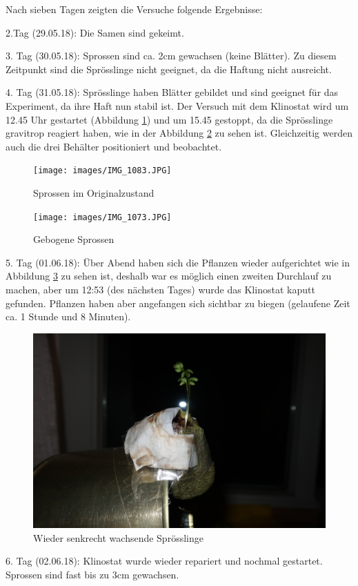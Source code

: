 \documentclass[
11pt, 
ngerman,
listof=totocnumbered,
oneside,
bibliography=totocnumbered,
abstracton
]{scrreprt}
\begin{document}
Nach sieben Tagen zeigten die Versuche folgende Ergebnisse:

2.Tag (29.05.18): Die Samen sind gekeimt. 

3. Tag (30.05.18): Sprossen sind ca. 2cm gewachsen (keine Blätter).
Zu diesem Zeitpunkt sind die Sprösslinge nicht geeignet, da die Haftung nicht ausreicht. 

4. Tag (31.05.18): Sprösslinge haben Blätter gebildet und sind geeignet für das Experiment, da ihre Haft nun stabil ist. Der Versuch mit dem Klinostat wird um 12.45 Uhr gestartet (Abbildung \ref{Foto 1}) und um 15.45 gestoppt, da die Sprösslinge gravitrop reagiert haben, wie in der Abbildung \ref{Foto 2} zu sehen ist. Gleichzeitig werden auch die drei Behälter positioniert und beobachtet.

\begin{figure}[H]
	  \centering 
	  \texttt{[image: images/IMG\_1083.JPG]}
	  \caption{Sprossen im Originalzustand \label{Foto 1}}
\end{figure}


\begin{figure}[H]
	  \centering 
	  \texttt{[image: images/IMG\_1073.JPG]}
	  \caption{Gebogene Sprossen \label{Foto 2}}
\end{figure}



5. Tag (01.06.18): Über Abend haben sich die Pflanzen wieder aufgerichtet wie in Abbildung \ref{Foto 3} zu sehen ist, deshalb war es möglich einen zweiten Durchlauf zu machen, aber um 12:53 (des nächsten Tages) wurde das Klinostat kaputt gefunden. Pflanzen haben aber angefangen sich sichtbar zu biegen (gelaufene Zeit ca. 1 Stunde und 8 Minuten).

\begin{figure}[H]
	\centering 
	\includegraphics[width = .5\linewidth]{images/IMG_1114.JPG}
	\caption{Wieder senkrecht wachsende Sprösslinge \label{Foto 3}}
\end{figure}

6. Tag (02.06.18): Klinostat wurde wieder repariert und nochmal gestartet. Sprossen sind fast bis zu 3cm gewachsen.
\end{document}
